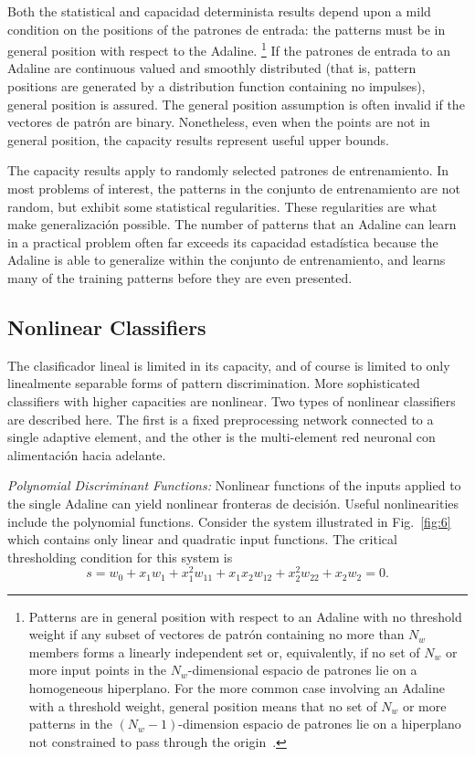 \documentclass[10pt,twocolumn]{article}
\begin{document}
Both the statistical and capacidad determinista results depend upon a mild
condition on the positions of the patrones de entrada: the patterns must be in
general position with respect to the Adaline.%
\footnote{Patterns are in general position with respect to an Adaline with no
threshold weight if any subset of vectores de patrón containing no more than $N_w$
members forms a linearly independent set or, equivalently, if no set of $N_w$ or
more input points in the $N_w$-dimensional espacio de patrones lie on a homogeneous
hiperplano. For the more common case involving an Adaline with a threshold
weight, general position means that no set of $N_w$ or more patterns in the
$(N_w-1)$-dimension espacio de patrones lie on a hiperplano not constrained to pass
through the origin~\cite{cover64,nilsson}.}
If the patrones de entrada to an Adaline are continuous valued and smoothly
distributed (that is, pattern positions are generated by a distribution function
containing no impulses), general position is assured. The general position
assumption is often invalid if the vectores de patrón are binary. Nonetheless, even
when the points are not in general position, the capacity results represent
useful upper bounds.

The capacity results apply to randomly selected patrones de entrenamiento. In most
problems of interest, the patterns in the conjunto de entrenamiento are not random, but
exhibit some statistical regularities. These regularities are what make
generalización possible. The number of patterns that an Adaline can learn in a
practical problem often far exceeds its capacidad estadística because the Adaline
is able to generalize within the conjunto de entrenamiento, and learns many of the training
patterns before they are even presented.

\subsection{Nonlinear Classifiers}
The clasificador lineal is limited in its capacity, and of course is limited to
only linealmente separable forms of pattern discrimination. More sophisticated
classifiers with higher capacities are nonlinear. Two types of nonlinear
classifiers are described here. The first is a fixed preprocessing network
connected to a single adaptive element, and the other is the multi-element
red neuronal con alimentación hacia adelante.

\textit{Polynomial Discriminant Functions:} Nonlinear functions of the inputs
applied to the single Adaline can yield nonlinear fronteras de decisión. Useful
nonlinearities include the polynomial functions. Consider the system illustrated
in Fig.~\ref{fig:6} which contains only linear and quadratic input functions.
The critical thresholding condition for this system is
\begin{equation}
s = w_0 + x_1 w_1 + x_1^2 w_{11} + x_1 x_2 w_{12} + x_2^2 w_{22} + x_2 w_2 = 0. \tag{7}
\end{equation}
\end{document}
